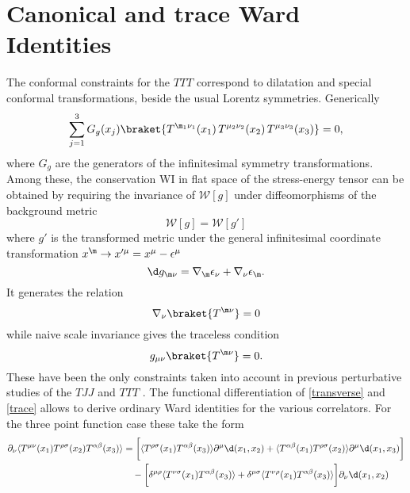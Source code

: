 \documentclass[a4paper,11pt,openright,twoside]{book}
\let\e=\epsilon \let\z=\zeta   \let\h=\eta     \let\q=\theta
\let\n=\nu      \let\x=\xi     \let\p=\pi      \let\r=\rho
\numberwithin{equation}{section}
\begin{document}
{{\section{Canonical and trace Ward Identities}
The conformal constraints for the $TTT$ correspond to dilatation and special conformal transformations, beside the 
usual Lorentz symmetries. Generically
\begin{equation}
	\sum_{j=1}^3G_g(x_j)\braket{T^{\m_1\n_1}(x_1)\,T^{\mu_2\nu_2}(x_2)\,T^{\mu_3\nu_3}(x_3)}=0,
\end{equation}
where $G_g$ are the generators of the infinitesimal symmetry transformations. Among these, the conservation WI in flat space of the stress-energy tensor can be obtained by requiring the invariance of $\mathcal{W}[g]$ under diffeomorphisms of the background metric 
\begin{equation}
	\mathcal{W}[g]=\mathcal{W}[g']
\end{equation}
where $g'$ is the transformed metric under the general infinitesimal coordinate transformation $x^\m\to x'^\mu=x^\mu -\e^\mu$
\begin{equation}
	\d g_{\m \n }=\nabla_\m \epsilon_\n +\nabla_\n \e_\m.
\end{equation} It generates the relation
\begin{equation}
	\nabla_\n \braket{T^{\m \n}}=0
	\label{transverse}
\end{equation}
while naive scale invariance gives the traceless condition
\begin{equation}
	g_{\mu\nu}\braket{T^{\m\n}}=0.\label{trace}
\end{equation}
These have been the only constraints taken into account in previous perturbative studies of the $TJJ$  
\cite{Giannotti:2008cv,Armillis:2009pq,Armillis:2010qk} and $TTT$ \cite{Coriano:2012wp}. The functional differentiation of \eqref{transverse} and \eqref{trace} allows to derive ordinary Ward identities for the various correlators. 
For the three point function case these take the form 
\begin{align} \label{WI3PFcoordinate}
	\partial_\nu\langle T^{\mu\nu}(x_1)T^{\rho\sigma}(x_2)T^{\alpha\beta}(x_3) \rangle
	&=
	\bigg[\langle T^{\rho\sigma}(x_1)T^{\alpha\beta}(x_3)\rangle\partial^\mu\d(x_1,x_2) + 
	\langle T^{\alpha\beta}(x_1)T^{\rho\sigma}(x_2)\rangle\partial^\mu\d(x_1,x_3) \bigg]\notag\\ 
	&\quad-
	\bigg[\delta^{\mu\rho}\langle T^{\nu\sigma}(x_1)T^{\alpha\beta}(x_3)\rangle
	+     \delta^{\mu\sigma}\langle T^{\nu\rho}(x_1)T^{\alpha\beta}(x_3)\rangle\bigg]\partial_\nu\d(x_1,x_2)\notag\\

\end{align}}}
\end{document}
